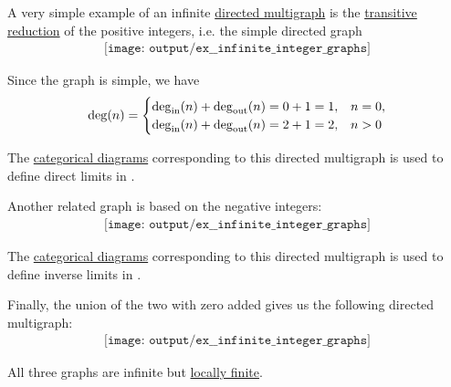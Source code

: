 \begin{example}\label{ex:infinite_integer_graphs}
  A very simple example of an infinite \hyperref[def:directed_multigraph]{directed multigraph} is the \hyperref[def:relation_closures/transitive]{transitive reduction} of the positive integers, i.e. the simple directed graph
  \begin{equation}\label{eq:ex:infinite_integer_graphs/positive}
    \begin{aligned}
      \texttt{[image: output/ex\_\_infinite\_integer\_graphs]}
    \end{aligned}
  \end{equation}

  Since the graph is simple, we have
  \begin{equation*}
    \deg(n) = \begin{cases}
      \deg_{\operatorname{in}}(n) + \deg_{\operatorname{out}}(n) = 0 + 1 = 1, &n = 0, \\
      \deg_{\operatorname{in}}(n) + \deg_{\operatorname{out}}(n) = 2 + 1 = 2, &n > 0 \\
    \end{cases}
  \end{equation*}

  The \hyperref[def:categorical_diagram]{categorical diagrams} corresponding to this directed multigraph is used to define direct limits in .

  Another related graph is based on the negative integers:
  \begin{equation}\label{eq:ex:infinite_integer_graphs/negative}
    \begin{aligned}
      \texttt{[image: output/ex\_\_infinite\_integer\_graphs]}
    \end{aligned}
  \end{equation}

  The \hyperref[def:categorical_diagram]{categorical diagrams} corresponding to this directed multigraph is used to define inverse limits in .

  Finally, the union of the two with zero added gives us the following directed multigraph:
  \begin{equation}\label{eq:ex:infinite_integer_graphs/two_sided}
    \begin{aligned}
      \texttt{[image: output/ex\_\_infinite\_integer\_graphs]}
    \end{aligned}
  \end{equation}

  All three graphs are infinite but \hyperref[def:graph_cardinality/local]{locally finite}.
\end{example}

